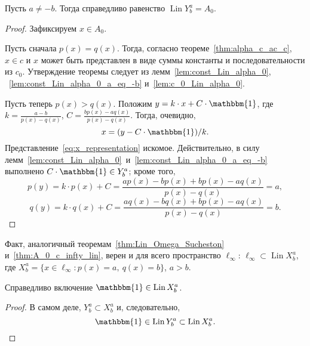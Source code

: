 \begin{theorem}
	\label{thm:A_0_c_infty_lin}
	Пусть $a\neq -b$.
	Тогда справедливо равенство $\operatorname{Lin} Y^a_b = A_0$.
\end{theorem}

\begin{proof}
	Зафиксируем $x \in A_0$.

	Пусть сначала $p(x) = q(x)$.
	Тогда, согласно теореме~\ref{thm:alpha_c_ac_c}, $x\in c$
	и $x$ может быть представлен в виде суммы константы и последовательности из $c_0$.
	Утверждение теоремы следует из лемм~\ref{lem:const_Lin_alpha_0}, ~\ref{lem:const_Lin_alpha_0_a_eq_-b} и~\ref{lem:c_0_Lin_alpha_0}.

	Пусть теперь $p(x) > q(x)$.
	Положим $y=k\cdot x + C\cdot\mathbbm{1}$,
	где $k=\frac{a-b}{p(x)-q(x)}$, $C=\frac{bp(x)-aq(x)}{p(x)-q(x)}$.
	Тогда, очевидно,
	\begin{equation}
		\label{eq:x_representation}
		x=(y-C\cdot\mathbbm{1})/k
		.
	\end{equation}
	Представление~\eqref{eq:x_representation} искомое.
	Действительно, в силу лемм~\ref{lem:const_Lin_alpha_0}~и~\ref{lem:const_Lin_alpha_0_a_eq_-b} выполнено
	$C\cdot\mathbbm{1}\in Y^a_b$; кроме того,
	\begin{equation}
		p(y) = k\cdot p(x) + C
		=
		\frac{ap(x)-bp(x)+bp(x)-aq(x)}{p(x)-q(x)}
		=
		a
		,
	\end{equation}
	\begin{equation}
		q(y) = k\cdot q(x) + C
		=
		\frac{aq(x)-bq(x)+bp(x)-aq(x)}{p(x)-q(x)}
		=
		b
		.
	\end{equation}


\end{proof}

Факт, аналогичный теоремам~\ref{thm:Lin_Omega_Sucheston} и~\ref{thm:A_0_c_infty_lin}, верен и для
всего пространство $\ell_\infty$:
$\ell_\infty\subset \operatorname{Lin} X^a_b$, где
$X^a_b = \{x\in\ell_\infty : p(x) = a,~ q(x) = b\}$, $a>b$.


\begin{lemma}
	\label{lem:const_Lin_ell_infty}
	Справедливо включение
	$\mathbbm{1}\in \operatorname{Lin} X^a_b$.
\end{lemma}

\begin{proof}
	В самом деле,
	$Y^a_b \subset X^a_b$
	и, следовательно,
	\begin{equation}
		\mathbbm{1} \in \operatorname{Lin} Y^a_b \subset \operatorname{Lin} X^a_b
		.
	\end{equation}
\end{proof}


